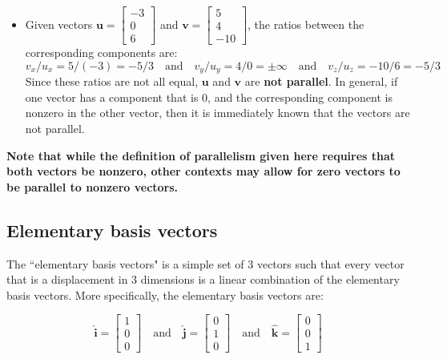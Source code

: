 \documentclass{article}
\begin{document}
\begin{itemize}
\item Given vectors \(\mathbf{u} = \begin{bmatrix} -3 \\ 0 \\ 6 \end{bmatrix}\) and \(\mathbf{v} = \begin{bmatrix} 5 \\ 4 \\ -10 \end{bmatrix}\), the ratios between the corresponding components are:
\[v_x/u_x = 5/(-3) = -5/3 \quad\text{and}\quad v_y/u_y = 4/0 = \pm\infty \quad\text{and}\quad v_z/u_z = -10/6 = -5/3\]
Since these ratios are not all equal, \(\mathbf{u}\) and \(\mathbf{v}\) are {\bf not parallel}. In general, if one vector has a component that is \(0\), and the corresponding component is nonzero in the other vector, then it is immediately known that the vectors are not parallel.
\end{itemize}

{\bf Note that while the definition of parallelism given here requires that both vectors be nonzero, other contexts may allow for zero vectors to be parallel to nonzero vectors.}


\subsection*{Elementary basis vectors}

The ``elementary basis vectors" is a simple set of \(3\) vectors such that every vector that is a displacement in \(3\) dimensions is a linear combination of the elementary basis vectors. More specifically, the elementary basis vectors are:

\[\hat{\mathbf{i}} = \begin{bmatrix} 1 \\ 0 \\ 0 \end{bmatrix} \quad\text{and}\quad \hat{\mathbf{j}} = \begin{bmatrix} 0 \\ 1 \\ 0 \end{bmatrix} \quad\text{and}\quad \hat{\mathbf{k}} = \begin{bmatrix} 0 \\ 0\\ 1 \end{bmatrix}\]
\end{document}
